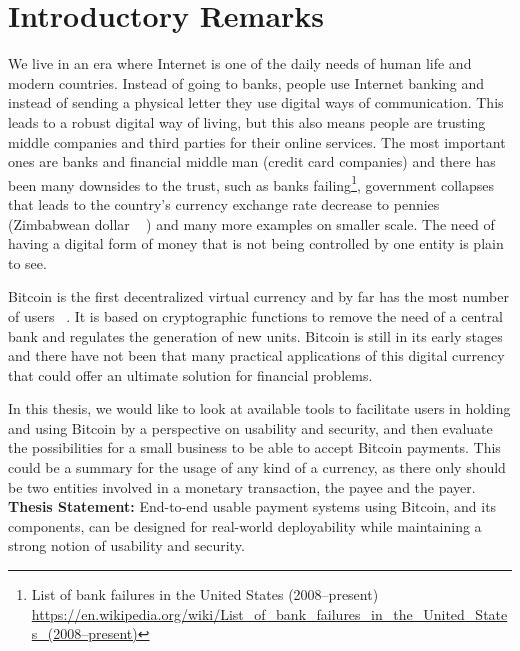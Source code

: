 


\chapter{Introductory Remarks}

\setcounter{page}{1}

We live in an era where Internet is one of the daily needs of human life and modern countries. Instead of going to banks, people use Internet banking and instead of sending a physical letter they use digital ways of communication. This leads to a robust digital way of living, but this also means people are trusting middle companies and third parties for their online services. The most important ones are banks and financial middle man (\eg credit card companies) and there has been many downsides to the trust, such as banks failing\footnote{List of bank failures in the United States (2008–present) \url{https://en.wikipedia.org/wiki/List_of_bank_failures_in_the_United_States_(2008–present)}}, government collapses that leads to the country's currency exchange rate decrease to pennies (\eg Zimbabwean dollar ~\cite{hanke2009measurement} ) and many more examples on smaller scale. The need of having a digital form of money that is not being controlled by one entity is plain to see.

Bitcoin is the first decentralized virtual currency and by far has the most number of users ~\cite{Nak08}. It is based on cryptographic functions to remove the need of a central bank and regulates the generation of new units. Bitcoin is still in its early stages and there have not been that many practical applications of this digital currency that could offer an ultimate solution for financial problems.

In this thesis, we would like to look at available tools to facilitate users in holding and using Bitcoin by a perspective on usability and security, and then evaluate the possibilities for a small business to be able to accept Bitcoin payments. This could be a summary for the usage of any kind of a currency, as there only should be two entities involved in a monetary transaction, the payee and the payer.\\

\textbf{Thesis Statement:} End-to-end usable payment systems using Bitcoin, and its components, can be designed for real-world deployability while maintaining a strong notion of usability and security.


